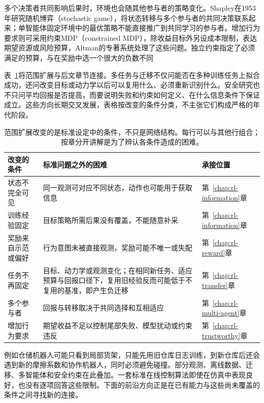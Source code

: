 多个决策者共同影响后果时，环境也会随其他参与者的策略变化。Shapley在1953年研究随机博弈（stochastic game），将状态转移与多个参与者的共同决策联系起来；单智能体固定环境中的最优策略不能直接推广到共同学习的参与者。增加行为要求则可采用约束MDP（constrained MDP），除收益目标外另设成本限制，表达期望资源或风险预算，Altman的专著系统处理了这些问题。独立约束指定了必须满足的预算，与在奖励中选一个很大的负数不同

表~\ref{tab:rl-overview-expansion}将范围扩展与后文章节连接。多任务与迁移不仅问能否在多种训练任务上拟合成功，还问改变目标或动力学以后可以复用什么、必须重新识别什么。安全研究也不只问平均回报是否提高，而要说明失败和约束如何定义、在什么信息条件下保证成立。这些方向长期交叉发展，表格按改变的条件分类，不主张它们构成严格的年代阶段。

\begin{table}[htbp]
  \centering\small
  \begin{tabularx}{\linewidth}{@{}>{\raggedright\arraybackslash}p{29mm}>{\raggedright\arraybackslash}X>{\raggedright\arraybackslash}p{32mm}@{}}
    \toprule
    改变的条件 & 标准问题之外的困难 & 承接位置\\
    \midrule
    状态不完全可见 & 同一观测可对应不同状态，动作也可能用于获取信息 & 第~\ref{chap:rl-information}章\\
    训练经验固定 & 目标策略所需后果没有覆盖，不能随意补采 & 第~\ref{chap:rl-information}章\\
    奖励来自示范或偏好 & 行为意图未被直接观测，奖励可能不唯一或失配 & 第~\ref{chap:rl-reward}章\\
    任务不再固定 & 目标、动力学或观测变化；在相同新任务、适应预算与回报口径下，复用旧经验反而可能低于不复用的基准，即产生负迁移 & 第~\ref{chap:rl-transfer}章\\
    多个参与者 & 回报与转移取决于共同选择和互相适应 & 第~\ref{chap:rl-multi-agent}章\\
    增加行为要求 & 期望收益不足以控制尾部失败、模型扰动或约束违反 & 第~\ref{chap:rl-trustworthy}章\\
    \bottomrule
  \end{tabularx}
  \caption{范围扩展改变的是标准设定中的条件，不只是网络结构。每行可以与其他行组合；按章分开讲解是为了辨认各条件造成的困难。}
  \label{tab:rl-overview-expansion}
\end{table}

例如仓储机器人可能只看到局部货架，只能先用旧仓库日志训练，到新仓库后还会遇到新的摩擦系数和协作机器人，同时必须避免碰撞。部分观测、离线数据、迁移、多智能体和安全约束在此叠加。一套标准在线控制算法即使在仿真中表现良好，也没有逐项回答这些限制。下面的前沿方向正是在已有能力与这些尚未覆盖的条件之间寻找新的连接。

